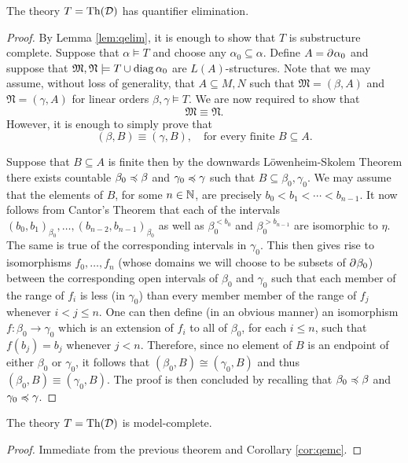 \begin{thm}
	The theory $T=\operatorname{Th}(\mathcal{D})$ has quantifier elimination.
\end{thm}
\begin{proof}
	By Lemma \ref{lem:qelim}, it is enough to show that $T$ is substructure complete.  Suppose that $\alpha\models T$ and choose any $\alpha_0\subseteq\alpha$.  Define $A=\partial^{}{}\alpha_0$ and suppose that $\mathfrak{M},\mathfrak{N}\models T\cup\operatorname{diag}{\alpha_0}$ are $L(A)$-structures.  Note that we may assume, without loss of generality, that $A\subseteq M,N$ such that $\mathfrak{M}=(\beta,A)$ and $\mathfrak{N}=(\gamma,A)$ for linear orders $\beta,\gamma\models T$.  We are now required to show that
	\begin{equation}
		\mathfrak{M}\equiv\mathfrak{N}.
	\end{equation}
	However, it is enough to simply prove that
	\begin{equation}
		(\beta,B)\equiv(\gamma,B),\quad\text{for every finite }B\subseteq A.
	\end{equation}

	Suppose that $B\subseteq A$ is finite then by the downwards L\"owenheim-Skolem Theorem there exists countable $\beta_0\preccurlyeq\beta$ and $\gamma_0\preccurlyeq\gamma$ such that $B\subseteq\beta_0,\gamma_0$.  We may assume that the elements of $B$, for some $n\in\mathbb{N}$, are precisely $b_0<b_1<\dotsb<b_{n-1}$.  It now follows from Cantor's Theorem that each of the intervals $(b_0,b_1)_{\beta_0},\dotsc,(b_{n-2},b_{n-1})_{\beta_0}$ as well as $\beta_0^{<b_0}$ and $\beta_0^{>b_{n-1}}$ are isomorphic to $\eta$.  The same is true of the corresponding intervals in $\gamma_0$.  This then gives rise to isomorphisms $f_0,\dotsc,f_n$ (whose domains we will choose to be subsets of $\partial^{}{}\beta_0$) between the corresponding open intervals of $\beta_0$ and $\gamma_0$ such that each member of the range of $f_i$ is less (in $\gamma_0$) than every member member of the range of $f_j$ whenever $i<j\leq n$.  One can then define (in an obvious manner) an isomorphism $f\colon\beta_0\to\gamma_0$ which is an extension of $f_i$ to all of $\beta_0$, for each $i\leq n$, such that $f(b_j)=b_j$ whenever $j<n$.  Therefore, since no element of $B$ is an endpoint of either $\beta_0$ or $\gamma_0$, it follows that $(\beta_0,B)\cong(\gamma_0,B)$ and thus $(\beta_0,B)\equiv(\gamma_0,B)$.  The proof is then concluded by recalling that $\beta_0\preccurlyeq\beta$ and $\gamma_0\preccurlyeq\gamma$.
\end{proof}

\begin{cor}
	The theory $T=\operatorname{Th}(\mathcal{D})$ is model-complete.
\end{cor}
\begin{proof}
	Immediate from the previous theorem and Corollary \ref{cor:qemc}.
\end{proof}

